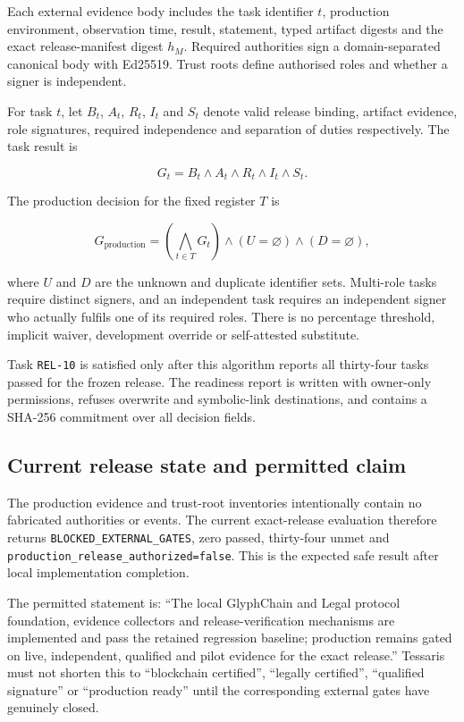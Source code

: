 Each external evidence body includes the task identifier $t$, production
environment, observation time, result, statement, typed artifact digests and the
exact release-manifest digest $h_M$.  Required authorities sign a domain-separated
canonical body with Ed25519.  Trust roots define authorised roles and whether a
signer is independent.

For task $t$, let $B_t$, $A_t$, $R_t$, $I_t$ and $S_t$ denote valid release
binding, artifact evidence, role signatures, required independence and separation
of duties respectively.  The task result is

\begin{equation}
  G_t = B_t \land A_t \land R_t \land I_t \land S_t.
\end{equation}

The production decision for the fixed register $T$ is

\begin{equation}
  G_{\mathrm{production}} =
  \left(\bigwedge_{t \in T} G_t\right)
  \land (U=\varnothing)
  \land (D=\varnothing),
\end{equation}

where $U$ and $D$ are the unknown and duplicate identifier sets.  Multi-role tasks
require distinct signers, and an independent task requires an independent signer
who actually fulfils one of its required roles.  There is no percentage threshold,
implicit waiver, development override or self-attested substitute.

Task \texttt{REL-10} is satisfied only after this algorithm reports all thirty-four
tasks passed for the frozen release.  The readiness report is written with
owner-only permissions, refuses overwrite and symbolic-link destinations, and
contains a SHA-256 commitment over all decision fields.

\subsection{Current release state and permitted claim}

The production evidence and trust-root inventories intentionally contain no
fabricated authorities or events.  The current exact-release evaluation therefore
returns \texttt{BLOCKED\_EXTERNAL\_GATES}, zero passed, thirty-four unmet and
\texttt{production\_release\_authorized=false}.  This is the expected safe result
after local implementation completion.

The permitted statement is: ``The local GlyphChain and Legal protocol foundation,
evidence collectors and release-verification mechanisms are implemented and pass
the retained regression baseline; production remains gated on live, independent,
qualified and pilot evidence for the exact release.''  Tessaris must not shorten
this to ``blockchain certified'', ``legally certified'', ``qualified signature''
or ``production ready'' until the corresponding external gates have genuinely
closed.

